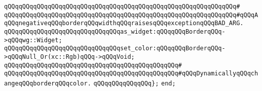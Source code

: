 \verb|qQQqqQQqqQQqqQQqqQQqqQQqqQQqqQQqqQQqqQQqqQQqqQQqqQQqqQQqqQQqqQQq#|\newline
\verb|qQQqqQQqqQQqqQQqqQQqqQQqqQQqqQQqqQQqqQQqqQQqqQQqqQQqqQQqqQQqqQQq#qQQqAqQQqnegativeqQQqborderqQQqwidthqQQqraisesqQQqexceptionqQQqBAD_ARG.|\newline
\newline
\verb|qQQqqQQqqQQqqQQqqQQqqQQqqQQqqQQqas_widget:qQQqqQQqBorderqQQq->qQQqwg::Widget;|\newline
\newline
\verb|qQQqqQQqqQQqqQQqqQQqqQQqqQQqqQQqset_color:qQQqqQQqBorderqQQq->qQQqNull_Or(xc::Rgb)qQQq->qQQqVoid;|\newline
\verb|qQQqqQQqqQQqqQQqqQQqqQQqqQQqqQQqqQQqqQQqqQQqqQQq#|\newline
\verb|qQQqqQQqqQQqqQQqqQQqqQQqqQQqqQQqqQQqqQQqqQQqqQQq#qQQqDynamicallyqQQqchangeqQQqborderqQQqcolor.|\newline
\verb|qQQqqQQqqQQqqQQq};|\newline
\newline
\verb|end;|\newline

